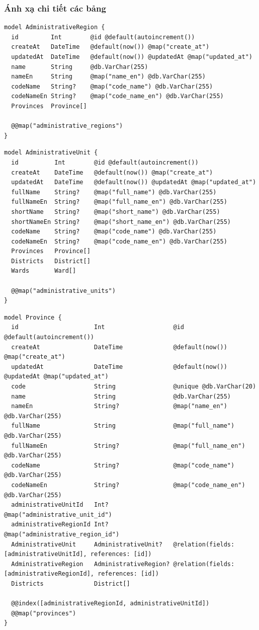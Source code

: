 \subsubsection{Ánh xạ chi tiết các bảng}
{\scriptsize
\begin{lstlisting}[caption={Ánh xạ bảng AdministrativeRegion},captionpos=b]
model AdministrativeRegion {
  id         Int        @id @default(autoincrement())
  createAt   DateTime   @default(now()) @map("create_at")
  updatedAt  DateTime   @default(now()) @updatedAt @map("updated_at")
  name       String     @db.VarChar(255)
  nameEn     String     @map("name_en") @db.VarChar(255)
  codeName   String?    @map("code_name") @db.VarChar(255)
  codeNameEn String?    @map("code_name_en") @db.VarChar(255)
  Provinces  Province[]

  @@map("administrative_regions")
}
\end{lstlisting}}
{\scriptsize
\begin{lstlisting}[caption={Ánh xạ bảng AdministrativeUnit},captionpos=b]
model AdministrativeUnit {
  id          Int        @id @default(autoincrement())
  createAt    DateTime   @default(now()) @map("create_at")
  updatedAt   DateTime   @default(now()) @updatedAt @map("updated_at")
  fullName    String?    @map("full_name") @db.VarChar(255)
  fullNameEn  String?    @map("full_name_en") @db.VarChar(255)
  shortName   String?    @map("short_name") @db.VarChar(255)
  shortNameEn String?    @map("short_name_en") @db.VarChar(255)
  codeName    String?    @map("code_name") @db.VarChar(255)
  codeNameEn  String?    @map("code_name_en") @db.VarChar(255)
  Provinces   Province[]
  Districts   District[]
  Wards       Ward[]

  @@map("administrative_units")
}
\end{lstlisting}}
{\scriptsize
\begin{lstlisting}[caption={Ánh xạ bảng Province},captionpos=b]
model Province {
  id                     Int                   @id @default(autoincrement())
  createAt               DateTime              @default(now()) @map("create_at")
  updatedAt              DateTime              @default(now()) @updatedAt @map("updated_at")
  code                   String                @unique @db.VarChar(20)
  name                   String                @db.VarChar(255)
  nameEn                 String?               @map("name_en") @db.VarChar(255)
  fullName               String                @map("full_name") @db.VarChar(255)
  fullNameEn             String?               @map("full_name_en") @db.VarChar(255)
  codeName               String?               @map("code_name") @db.VarChar(255)
  codeNameEn             String?               @map("code_name_en") @db.VarChar(255)
  administrativeUnitId   Int?                  @map("administrative_unit_id")
  administrativeRegionId Int?                  @map("administrative_region_id")
  AdministrativeUnit     AdministrativeUnit?   @relation(fields: [administrativeUnitId], references: [id])
  AdministrativeRegion   AdministrativeRegion? @relation(fields: [administrativeRegionId], references: [id])
  Districts              District[]

  @@index([administrativeRegionId, administrativeUnitId])
  @@map("provinces")
}
\end{lstlisting}}

